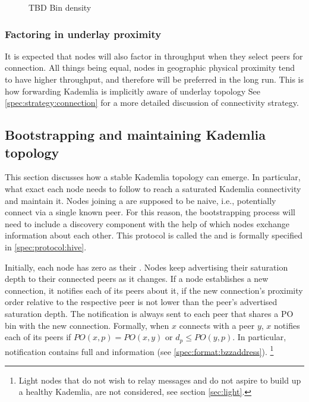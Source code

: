 \begin{figure}[htbp]
   \centering
   \caption[Bin density]{TBD Bin density}
   \label{fig:bindensity}
\end{figure}

\subsubsection{Factoring in underlay proximity}
It is expected that nodes will also factor in throughput when they select peers for connection. All things being equal, nodes in geographic physical proximity tend to have higher throughput, and therefore will be preferred in the long run. This is how forwarding Kademlia is implicitly aware of underlay topology \cite{heep2010r}See \ref{spec:strategy:connection} for a more detailed discussion of connectivity strategy.


\subsection{Bootstrapping and maintaining Kademlia topology}\label{sec:bootstrapping}
 
 
This  section discusses how a stable Kademlia topology  can emerge. In particular, what exact  each node needs to follow to reach a saturated Kademlia connectivity and maintain it. Nodes joining a  are supposed to be naive, i.e., potentially connect via a single known peer. For this reason, the bootstrapping process will need to include a discovery component with the help of which nodes exchange information about each other. This protocol is called the  and is formally specified in \ref{spec:protocol:hive}.

Initially, each node has zero as their . Nodes keep advertising their saturation depth to their connected peers as it changes. If a node establishes a new connection, it notifies each of its peers about it, if the new connection's proximity order relative to the respective peer is not lower than the peer's advertised saturation depth. The notification is always sent to each peer that shares a PO bin with the new connection. Formally, when $x$ connects with a peer $y$, $x$ notifies each of its peers if $\mathit{PO}(x, p) = \mathit{PO}(x, y)$ or $d_p\leq \mathit{PO}(y, p)$. In particular, notification contains full  and  information (see \ref{spec:format:bzzaddress}).%
%
\footnote{Light nodes that do not wish to relay messages and do not aspire to build up a healthy Kademlia, are not considered, see section \ref{sec:light}. }

